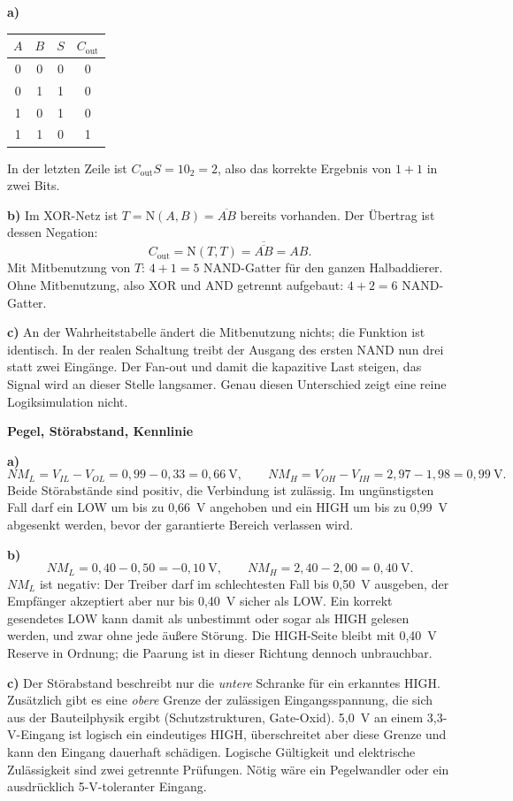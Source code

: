 \documentclass[10pt,a4paper]{article}
\newcommand{\titlepagepart}[2]{\vspace*{-4mm}{\sffamily\small #1}\par{\sffamily\LARGE\bfseries #2}\par\vspace{2mm}}
\newcommand{\block}[1]{\par\vspace{2mm}{\sffamily\large\bfseries #1}\par}
\newcommand{\N}{\mathrm{N}}
\begin{document}
\block{5. Halbaddierer: die Brücke zu Tag 4}
\textbf{a)}
\begin{center}
\begin{tabular}{cc|cc}\toprule
$A$&$B$&$S$&$C_{\text{out}}$\\\midrule
0&0&0&0\\
0&1&1&0\\
1&0&1&0\\
1&1&0&1\\\bottomrule
\end{tabular}
\end{center}
In der letzten Zeile ist $C_{\text{out}}S=10_2=2$, also das korrekte Ergebnis
von $1+1$ in zwei Bits.

\textbf{b)} Im XOR-Netz ist $T=\N(A,B)=\overline{AB}$ bereits vorhanden.
Der Übertrag ist dessen Negation:
\[
C_{\text{out}}=\N(T,T)=\overline{\overline{AB}}=AB .
\]
Mit Mitbenutzung von $T$: $4+1=5$ NAND-Gatter für den ganzen Halbaddierer.
Ohne Mitbenutzung, also XOR und AND getrennt aufgebaut: $4+2=6$ NAND-Gatter.

\textbf{c)} An der Wahrheitstabelle ändert die Mitbenutzung nichts; die
Funktion ist identisch. In der realen Schaltung treibt der Ausgang des ersten
NAND nun drei statt zwei Eingänge. Der Fan-out und damit die kapazitive Last
steigen, das Signal wird an dieser Stelle langsamer. Genau diesen Unterschied
zeigt eine reine Logiksimulation nicht.

\newpage
\titlepagepart{03 / LÖSUNGEN ZU SEITE 4}{Pegel, Störabstand, Kennlinie}

\block{6. Störabstände berechnen}
\textbf{a)}
\[
NM_L=V_{IL}-V_{OL}=0{,}99-0{,}33=0{,}66\ \text{V},\qquad
NM_H=V_{OH}-V_{IH}=2{,}97-1{,}98=0{,}99\ \text{V}.
\]
Beide Störabstände sind positiv, die Verbindung ist zulässig. Im ungünstigsten
Fall darf ein LOW um bis zu 0,66~V angehoben und ein HIGH um bis zu 0,99~V
abgesenkt werden, bevor der garantierte Bereich verlassen wird.

\textbf{b)}
\[
NM_L=0{,}40-0{,}50=-0{,}10\ \text{V},\qquad
NM_H=2{,}40-2{,}00=0{,}40\ \text{V}.
\]
$NM_L$ ist negativ: Der Treiber darf im schlechtesten Fall bis 0,50~V ausgeben,
der Empfänger akzeptiert aber nur bis 0,40~V sicher als LOW. Ein korrekt
gesendetes LOW kann damit als unbestimmt oder sogar als HIGH gelesen werden,
und zwar ohne jede äußere Störung. Die HIGH-Seite bleibt mit 0,40~V Reserve in
Ordnung; die Paarung ist in dieser Richtung dennoch unbrauchbar.

\textbf{c)} Der Störabstand beschreibt nur die \emph{untere} Schranke für ein
erkanntes HIGH. Zusätzlich gibt es eine \emph{obere} Grenze der zulässigen
Eingangsspannung, die sich aus der Bauteilphysik ergibt (Schutzstrukturen,
Gate-Oxid). 5,0~V an einem 3,3-V-Eingang ist logisch ein eindeutiges HIGH,
überschreitet aber diese Grenze und kann den Eingang dauerhaft schädigen.
Logische Gültigkeit und elektrische Zulässigkeit sind zwei getrennte Prüfungen.
Nötig wäre ein Pegelwandler oder ein ausdrücklich 5-V-toleranter Eingang.
\end{document}
